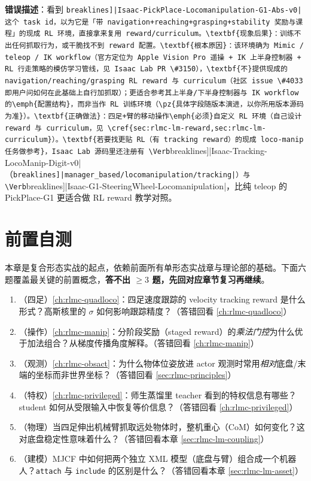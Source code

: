 \begin{pitfall}
\textbf{错误描述}：看到 \Verb[breaklines]|Isaac-PickPlace-Locomanipulation-G1-Abs-v0| 这个 task id，以为它是「带 navigation+reaching+grasping+stability 奖励与课程」的现成 RL 环境，直接拿来复用 reward/curriculum。\textbf{现象后果}：训练不出任何抓取行为，或干脆找不到 reward 配置。\textbf{根本原因}：该环境确为 Mimic / teleop / IK workflow（官方定位为 Apple Vision Pro 遥操 + IK 上半身控制器 + RL 行走策略的模仿学习管线，见 Isaac Lab PR \#3150），\textbf{不}提供现成的 navigation/reaching/grasping RL reward 与 curriculum（社区 issue \#4033 即用户问如何在此基础上自行加抓取）；更适合参考其上半身/下半身控制器与 IK workflow 的\emph{配置结构}，而非当作 RL 训练环境（\pz{具体字段随版本演进，以你所用版本源码为准}）。\textbf{正确做法}：四足+臂的移动操作\emph{必须}自定义 RL 环境（自己设计 reward 与 curriculum，见 \cref{sec:rlmc-lm-reward,sec:rlmc-lm-curriculum}）。\textbf{若要找更贴 RL（有 tracking reward）的现成 loco-manip 任务做参考}，Isaac Lab 源码里还注册有 \Verb[breaklines]|Isaac-Tracking-LocoManip-Digit-v0|（\Verb[breaklines]|manager_based/locomanipulation/tracking|）与 \Verb[breaklines]|Isaac-G1-SteeringWheel-Locomanipulation|，比纯 teleop 的 PickPlace-G1 更适合做 RL reward 教学对照。
\end{pitfall}

\section{前置自测}
\label{sec:rlmc-lm-pretest}

本章是复合形态实战的起点，依赖前面所有单形态实战章与理论部的基础。下面六题覆盖最关键的前置概念，\textbf{答不出 $\ge 3$ 题，先回对应章节复习再继续}。

\begin{practice}[开课前自测]
\begin{enumerate}
\item （四足）\cref{ch:rlmc-quadloco}：四足速度跟踪的 velocity tracking reward 是什么形式？高斯核里的 $\sigma$ 如何影响跟踪精度？（答错回看 \cref{ch:rlmc-quadloco}）
\item （操作）\cref{ch:rlmc-manip}：分阶段奖励（staged reward）的\emph{乘法门控}为什么优于加法组合？从梯度传播角度解释。（答错回看 \cref{ch:rlmc-manip}）
\item （观测）\cref{ch:rlmc-obsact}：为什么物体位姿放进 actor 观测时常用\emph{相对}底盘/末端的坐标而非世界坐标？（答错回看 \cref{sec:rlmc-principles}）
\item （特权）\cref{ch:rlmc-privileged}：师生蒸馏里 teacher 看到的特权信息有哪些？student 如何从受限输入中恢复等价信息？（答错回看 \cref{ch:rlmc-privileged}）
\item （物理）当四足伸出机械臂抓取远处物体时，整机重心（CoM）如何变化？这对底盘稳定性意味着什么？（答错回看本章 \cref{sec:rlmc-lm-coupling}）
\item （建模）MJCF 中如何把两个独立 XML 模型（底盘与臂）组合成一个机器人？\verb|attach| 与 \verb|include| 的区别是什么？（答错回看本章 \cref{sec:rlmc-lm-asset}）
\end{enumerate}
\end{practice}

